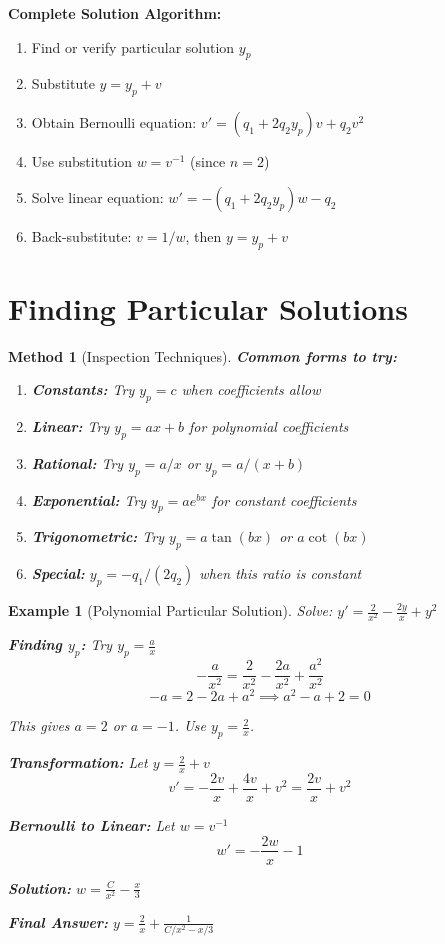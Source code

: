 \documentclass[12pt]{article}
\newtheorem{method}{Method}
\newtheorem{example}{Example}
\begin{document}
\begin{transformation}
\textbf{Complete Solution Algorithm:}
\begin{enumerate}
    \item Find or verify particular solution $y_p$
    \item Substitute $y = y_p + v$
    \item Obtain Bernoulli equation: $v' = (q_1 + 2q_2y_p)v + q_2v^2$
    \item Use substitution $w = v^{-1}$ (since $n = 2$)
    \item Solve linear equation: $w' = -(q_1 + 2q_2y_p)w - q_2$
    \item Back-substitute: $v = 1/w$, then $y = y_p + v$
\end{enumerate}
\end{transformation}

\section{Finding Particular Solutions}

\begin{method}[Inspection Techniques]
\textbf{Common forms to try:}
\begin{enumerate}
    \item \textbf{Constants:} Try $y_p = c$ when coefficients allow
    \item \textbf{Linear:} Try $y_p = ax + b$ for polynomial coefficients
    \item \textbf{Rational:} Try $y_p = a/x$ or $y_p = a/(x+b)$
    \item \textbf{Exponential:} Try $y_p = ae^{bx}$ for constant coefficients
    \item \textbf{Trigonometric:} Try $y_p = a\tan(bx)$ or $a\cot(bx)$
    \item \textbf{Special:} $y_p = -q_1/(2q_2)$ when this ratio is constant
\end{enumerate}
\end{method}

\begin{example}[Polynomial Particular Solution]
Solve: $y' = \frac{2}{x^2} - \frac{2y}{x} + y^2$

\textbf{Finding $y_p$:} Try $y_p = \frac{a}{x}$
$$-\frac{a}{x^2} = \frac{2}{x^2} - \frac{2a}{x^2} + \frac{a^2}{x^2}$$
$$-a = 2 - 2a + a^2 \implies a^2 - a + 2 = 0$$

This gives $a = 2$ or $a = -1$. Use $y_p = \frac{2}{x}$.

\textbf{Transformation:} Let $y = \frac{2}{x} + v$
$$v' = -\frac{2v}{x} + \frac{4v}{x} + v^2 = \frac{2v}{x} + v^2$$

\textbf{Bernoulli to Linear:} Let $w = v^{-1}$
$$w' = -\frac{2w}{x} - 1$$

\textbf{Solution:} $w = \frac{C}{x^2} - \frac{x}{3}$

\textbf{Final Answer:} $y = \frac{2}{x} + \frac{1}{C/x^2 - x/3}$
\end{example}
\end{document}
